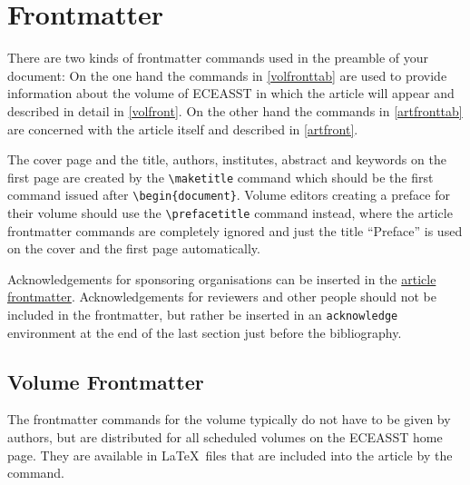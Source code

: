 \documentclass{eceasst}
\begin{document}
\section{Frontmatter}\label{front}
There are two kinds of frontmatter commands used in the preamble of your
document:
On the one hand the commands in \autoref{volfronttab} are used to provide
information about the volume of ECEASST in which the article will appear and
described in detail in \autoref{volfront}.
On the other hand the commands in \autoref{artfronttab} are concerned with the
article itself and described in \autoref{artfront}.

The cover page and the title, authors, institutes, abstract and keywords on the
first page are created by the \verb|\maketitle| command which should be the
first command issued after \verb|\begin{document}|.
Volume editors creating a preface for their volume should use the
\verb|\prefacetitle| command instead, where the article frontmatter commands
are completely ignored and just the title ``Preface'' is used on the cover and
the first page automatically.

Acknowledgements for sponsoring organisations can be inserted in the
\hyperref[artfront]{article frontmatter}.
Acknowledgements for reviewers and other people should not be included in the
frontmatter, but rather be inserted in an \verb|acknowledge| environment at
the end of the last section just before the bibliography.

\subsection{Volume Frontmatter}\label{volfront}
The frontmatter commands for the volume typically do not have to be given by
authors, but are distributed for all scheduled volumes on the ECEASST home page.
They are available in \LaTeX\ files that are included into the article by the
\verb|| command.
\end{document}
